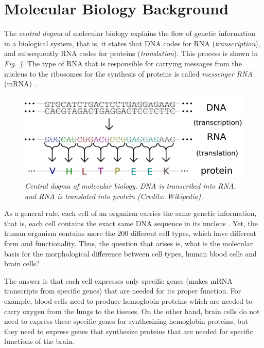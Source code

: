 \section{Molecular Biology Background} \label{molecular-back-sect}
The \emph{central dogma} of molecular biology explains the flow of genetic information in a biological system, that is, it states that DNA codes for RNA (\emph{transcription}), and subsequently RNA codes for proteins (\emph{translation}). This process is shown in \emph{Fig. \ref{central-dogma-pic}}. The type of RNA that is responsible for carrying messages from the nucleus to the ribosomes for the synthesis of proteins is called \emph{messenger RNA} (mRNA) \citep{Jasny2001}. 

\vspace*{5mm}
\begin{figure}[!ht]
\begin{center}
 \includegraphics[scale = 0.39]{images/central-dogma3.png}
\caption{\emph{Central dogma of molecular biology. DNA is transcribed into RNA, and RNA is translated into protein (Credits: Wikipedia).}}
\label{central-dogma-pic}
\end{center}
\end{figure}

As a general rule, each cell of an organism carries the same genetic information, that is, each cell contains the exact same DNA sequence in its nucleus \citep{Jasny2001}. Yet, the human organism contains more the $200$ different cell types, which have different form and functionality. Thus, the question that arises is, what is the molecular basis for the morphological difference between cell types, \eg human blood cells and brain cells? 

The answer is that each cell expresses only specific genes (\ie makes mRNA transcripts from specific genes) that are needed for its proper function. For example, blood cells need to produce hemoglobin proteins which are needed to carry oxygen from the lungs to the tissues. On the other hand, brain cells do not need to express these specific genes for synthesizing hemoglobin proteins, but they need to express genes that synthesize proteins that are needed for specific functions of the brain.


